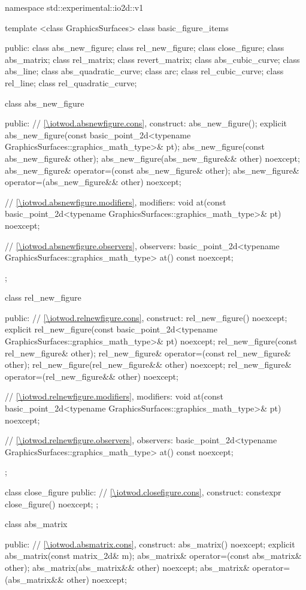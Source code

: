\begin{codeblock}
namespace std::experimental::io2d::v1 {
  template <class GraphicsSurfaces>
  class basic_figure_items {
  public:
    class abs_new_figure;
    class rel_new_figure;
    class close_figure;
    class abs_matrix;
    class rel_matrix;
    class revert_matrix;
    class abs_cubic_curve;
    class abs_line;
    class abs_quadratic_curve;
    class arc;
    class rel_cubic_curve;
    class rel_line;
    class rel_quadratic_curve;

    class abs_new_figure {
    public:
      // \ref{\iotwod.absnewfigure.cons}, construct:
      abs_new_figure();
      explicit abs_new_figure(const basic_point_2d<typename
      GraphicsSurfaces::graphics_math_type>& pt);
      abs_new_figure(const abs_new_figure& other);
      abs_new_figure(abs_new_figure&& other) noexcept;
      abs_new_figure& operator=(const abs_new_figure& other);
      abs_new_figure& operator=(abs_new_figure&& other) noexcept;

      // \ref{\iotwod.absnewfigure.modifiers}, modifiers:
      void at(const basic_point_2d<typename GraphicsSurfaces::graphics_math_type>& pt) noexcept;

      // \ref{\iotwod.absnewfigure.observers}, observers:
      basic_point_2d<typename GraphicsSurfaces::graphics_math_type> at() const noexcept;
    };

    class rel_new_figure {
    public:
      // \ref{\iotwod.relnewfigure.cons}, construct:
      rel_new_figure() noexcept;
      explicit rel_new_figure(const basic_point_2d<typename
        GraphicsSurfaces::graphics_math_type>& pt) noexcept;
      rel_new_figure(const rel_new_figure& other);
      rel_new_figure& operator=(const rel_new_figure& other);
      rel_new_figure(rel_new_figure&& other) noexcept;
      rel_new_figure& operator=(rel_new_figure&& other) noexcept;

      // \ref{\iotwod.relnewfigure.modifiers}, modifiers:
      void at(const basic_point_2d<typename GraphicsSurfaces::graphics_math_type>& pt) noexcept;

      // \ref{\iotwod.relnewfigure.observers}, observers:
      basic_point_2d<typename GraphicsSurfaces::graphics_math_type> at() const noexcept;
    };

    class close_figure {
    public:
      // \ref{\iotwod.closefigure.cons}, construct:
      constexpr close_figure() noexcept;
    };

    class abs_matrix {
	public:
      // \ref{\iotwod.absmatrix.cons}, construct:
      abs_matrix() noexcept;
      explicit abs_matrix(const matrix_2d& m);
      abs_matrix& operator=(const abs_matrix& other);
      abs_matrix(abs_matrix&& other) noexcept;
      abs_matrix& operator=(abs_matrix&& other) noexcept;
	
}}}
\end{codeblock}
